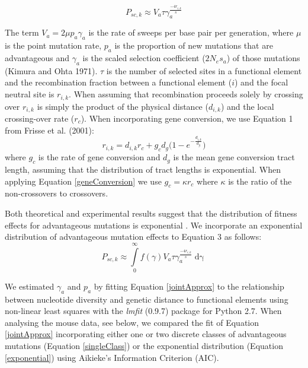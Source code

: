 \documentclass[11pt]{article}
\begin{document}
\begin{equation}
\label{singleClass}
P_{sc,k} \approx V_a \tau\gamma_a^{\frac{-4r_{i,k}}{s}} 
\end{equation}

The term $V_{a} = 2 \mu p_{a} \gamma_{a}$ is the rate of sweeps per base pair per generation, where $\mu$ is the point mutation rate, $p_a$ is the proportion of new mutations that are advantageous and $\gamma_a$ is the scaled selection coefficient ($2N_es_a$) of those mutations (Kimura and Ohta 1971). $\tau$ is the number of selected sites in a functional element and the recombination fraction between a functional element ($i$) and the focal neutral site is $r_{i,k}$. When assuming that recombination proceeds solely by crossing over $r_{i,k}$ is simply the product of the physical distance ($d_{i,k}$) and the local crossing-over rate ($r_c$). When incorporating gene conversion, we use Equation 1 from Frisse et al. (2001):
 		\begin{equation}
		\label{geneConversion}
		r_{i,k} = d_{i,k} r_c + g_c d_g \Bigg( 1 - e ^{-\frac{d_{i,k}}{d_g}} \Bigg)
		\end{equation} where $g_c$ is the rate of gene conversion and $d_g$ is the mean gene conversion tract length, assuming that the distribution of tract lengths is exponential. When applying Equation \ref{geneConversion} we use $g_c = \kappa r_c$ where $\kappa$ is the ratio of the non-crossovers to crossovers.
	
	Both theoretical and experimental results suggest that the distribution of fitness effects for advantageous mutations is exponential \citep{RN109}. We incorporate an exponential distribution of advantageous mutation effects to Equation 3 as follows:
		\begin{equation}
		\label{exponential}
P_{sc,k} \approx \int \limits_{0}^{\infty} f(\gamma) V_a \tau\gamma_a^{\frac{-4r_{i,k}}{s}} \mathop{d\gamma}
		\end{equation}

	
	We estimated $\gamma_a$ and $p_a$ by fitting Equation \ref{jointApprox} to the relationship between nucleotide diversity and genetic distance to functional elements using non-linear least squares with the \emph{lmfit} (0.9.7) package for Python 2.7. When analysing the mouse data, see below, we compared the fit of Equation \ref{jointApprox} incorporating either one or two discrete classes of advantageous mutations (Equation \ref{singleClass}) or the exponential distribution (Equation \ref{exponential}) using Aikieke's Information Criterion (AIC).
	
\end{document}

